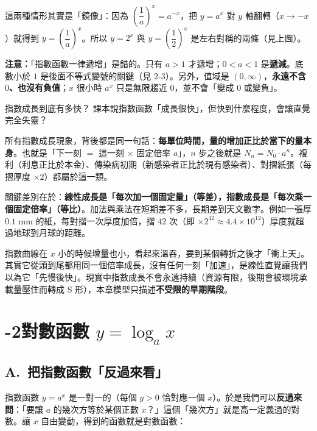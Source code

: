 \documentclass[11pt]{article}
\begin{document}

這兩種情形其實是「鏡像」：因為 $\left(\dfrac1a\right)^{x}=a^{-x}$，把 $y=a^x$ 對 $y$ 軸翻轉（$x\to-x$）就得到 $y=\left(\dfrac1a\right)^x$。所以 $y=2^x$ 與 $y=\left(\dfrac12\right)^x$ 是左右對稱的兩條（見上圖）。

\textbf{注意：}「指數函數一律遞增」是錯的。只有 $a>1$ 才遞增；$0<a<1$ 是\textbf{遞減}。底數小於 $1$ 是後面不等式變號的關鍵（見 2-3）。另外，值域是 $(0,\infty)$，\textbf{永遠不含 $0$、也沒有負值}；$x$ 很小時 $a^x$ 只是無限趨近 $0$，並不會「變成 $0$ 或變負」。

\begin{延伸框}{指數成長到底有多快？}
課本說指數函數「成長很快」，但快到什麼程度，會讓直覺完全失靈？

所有指數成長現象，背後都是同一句話：\textbf{每單位時間，量的增加正比於當下的量本身}。也就是「下一刻 $=$ 這一刻 $\times$ 固定倍率 $a$」，$n$ 步之後就是 $N_n=N_0\cdot a^{n}$。複利（利息正比於本金）、傳染病初期（新感染者正比於現有感染者）、對摺紙張（每摺厚度 $\times2$）都屬於這一類。

關鍵差別在於：\textbf{線性成長是「每次加一個固定量」（等差），指數成長是「每次乘一個固定倍率」（等比）}。加法與乘法在短期差不多，長期差到天文數字。例如一張厚 $0.1$ mm 的紙，每對摺一次厚度加倍，摺 $42$ 次（即 $\times 2^{42}\approx4.4\times10^{12}$）厚度就超過地球到月球的距離。

指數曲線在 $x$ 小的時候增量也小，看起來溫吞，要到某個轉折之後才「衝上天」。其實它從頭到尾都用同一個倍率成長，沒有任何一刻「加速」，是線性直覺讓我們以為它「先慢後快」。現實中指數成長不會永遠持續（資源有限，後期會被環境承載量壓住而轉成 S 形），本章模型只描述\textbf{不受限的早期階段}。
\end{延伸框}

\section*{-2\quad 對數函數 $y=\log_{a}x$}

\subsection*{\sffamily A.\ 把指數函數「反過來看」}

指數函數 $y=a^x$ 是一對一的（每個 $y>0$ 恰對應一個 $x$）。於是我們可以\textbf{反過來問}：「要讓 $a$ 的幾次方等於某個正數 $x$？」這個「幾次方」就是高一定義過的對數。讓 $x$ 自由變動，得到的函數就是對數函數：
\end{document}
